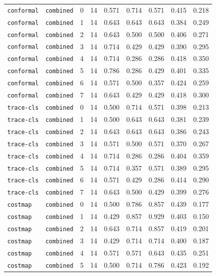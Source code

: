 \documentclass{article}
\begin{document}
\begin{center}
{\begin{tabular}{llllccccc}
\texttt{conformal} & \texttt{combined} & 0 & 14 & 0.571 & 0.714 & 0.571 & 0.415 & 0.218 \\
\texttt{conformal} & \texttt{combined} & 1 & 14 & 0.643 & 0.643 & 0.643 & 0.384 & 0.249 \\
\texttt{conformal} & \texttt{combined} & 2 & 14 & 0.643 & 0.500 & 0.500 & 0.406 & 0.271 \\
\texttt{conformal} & \texttt{combined} & 3 & 14 & 0.714 & 0.429 & 0.429 & 0.390 & 0.295 \\
\texttt{conformal} & \texttt{combined} & 4 & 14 & 0.714 & 0.286 & 0.286 & 0.418 & 0.350 \\
\texttt{conformal} & \texttt{combined} & 5 & 14 & 0.786 & 0.286 & 0.429 & 0.401 & 0.335 \\
\texttt{conformal} & \texttt{combined} & 6 & 14 & 0.571 & 0.500 & 0.357 & 0.424 & 0.259 \\
\texttt{conformal} & \texttt{combined} & 7 & 14 & 0.643 & 0.429 & 0.429 & 0.418 & 0.300 \\
\texttt{trace-cls} & \texttt{combined} & 0 & 14 & 0.500 & 0.714 & 0.571 & 0.398 & 0.213 \\
\texttt{trace-cls} & \texttt{combined} & 1 & 14 & 0.500 & 0.643 & 0.643 & 0.381 & 0.239 \\
\texttt{trace-cls} & \texttt{combined} & 2 & 14 & 0.643 & 0.643 & 0.643 & 0.386 & 0.243 \\
\texttt{trace-cls} & \texttt{combined} & 3 & 14 & 0.571 & 0.500 & 0.571 & 0.370 & 0.267 \\
\texttt{trace-cls} & \texttt{combined} & 4 & 14 & 0.714 & 0.286 & 0.286 & 0.404 & 0.359 \\
\texttt{trace-cls} & \texttt{combined} & 5 & 14 & 0.714 & 0.357 & 0.571 & 0.389 & 0.295 \\
\texttt{trace-cls} & \texttt{combined} & 6 & 14 & 0.571 & 0.429 & 0.286 & 0.414 & 0.290 \\
\texttt{trace-cls} & \texttt{combined} & 7 & 14 & 0.643 & 0.500 & 0.429 & 0.399 & 0.276 \\
\texttt{costmap} & \texttt{combined} & 0 & 14 & 0.500 & 0.786 & 0.857 & 0.439 & 0.177 \\
\texttt{costmap} & \texttt{combined} & 1 & 14 & 0.429 & 0.857 & 0.929 & 0.403 & 0.150 \\
\texttt{costmap} & \texttt{combined} & 2 & 14 & 0.643 & 0.714 & 0.857 & 0.419 & 0.201 \\
\texttt{costmap} & \texttt{combined} & 3 & 14 & 0.429 & 0.714 & 0.714 & 0.400 & 0.187 \\
\texttt{costmap} & \texttt{combined} & 4 & 14 & 0.571 & 0.571 & 0.643 & 0.435 & 0.251 \\
\texttt{costmap} & \texttt{combined} & 5 & 14 & 0.500 & 0.714 & 0.786 & 0.423 & 0.192 \\
\bottomrule
\end{tabular}%
}
\end{center}
\end{document}
